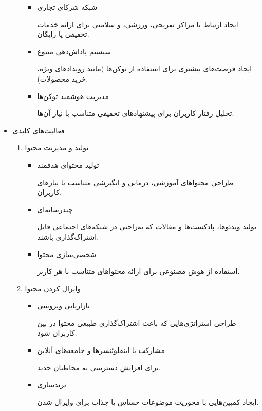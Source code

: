 \documentclass[dvipsnames, svgnames, x11names, 11pt]{article}
\begin{document}
\begin{itemize}
\begin{enumerate}
\begin{itemize}
\item 
شبکه شرکای تجاری

ایجاد ارتباط با مراکز تفریحی، ورزشی، و سلامتی برای ارائه خدمات تخفیفی یا رایگان.  

\item 
سیستم پاداش‌دهی متنوع

ایجاد فرصت‌های بیشتری برای استفاده از توکن‌ها (مانند رویدادهای ویژه، خرید محصولات).  

\item 
مدیریت هوشمند توکن‌ها

تحلیل رفتار کاربران برای پیشنهادهای تخفیفی متناسب با نیاز آن‌ها.  
\end{itemize}
\end{enumerate}

\item 
فعالیت‌های کلیدی
\begin{enumerate}
\item 
تولید و مدیریت محتوا  

\begin{itemize}
\item 
تولید محتوای هدفمند

طراحی محتواهای آموزشی، درمانی و انگیزشی متناسب با نیازهای کاربران.  

\item 
چندرسانه‌ای

تولید ویدئوها، پادکست‌ها و مقالات که به‌راحتی در شبکه‌های اجتماعی قابل اشتراک‌گذاری باشند.  

\item 
شخصی‌سازی محتوا

استفاده از هوش مصنوعی برای ارائه محتواهای متناسب با هر کاربر.  
\end{itemize}

\item 
وایرال کردن محتوا  

\begin{itemize}
\item 
بازاریابی ویروسی

طراحی استراتژی‌هایی که باعث اشتراک‌گذاری طبیعی محتوا در بین کاربران شود.  

\item 
مشارکت با اینفلوئنسرها و جامعه‌های آنلاین

برای افزایش دسترسی به مخاطبان جدید.  

\item 
ترندسازی

ایجاد کمپین‌هایی با محوریت موضوعات حساس یا جذاب برای وایرال شدن.  
\end{itemize}


\end{enumerate}
\end{itemize}
\end{document}
